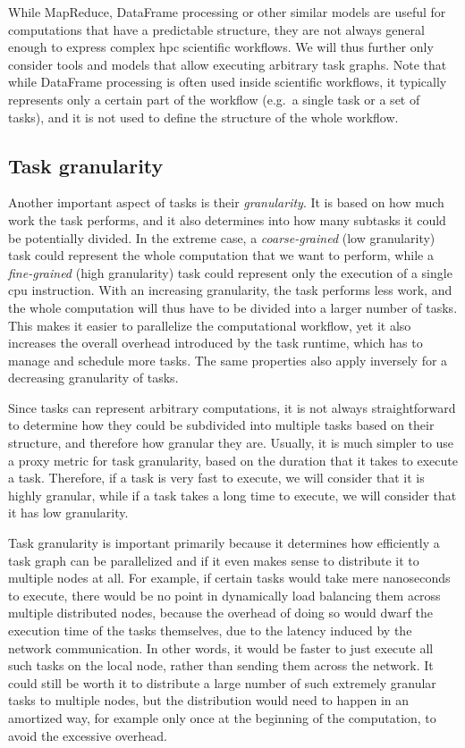 While MapReduce, DataFrame processing or other similar models are useful for computations that have
a predictable structure, they are not always general enough to express complex
\gls{hpc} scientific workflows. We will thus further only consider tools and models
that allow executing arbitrary task graphs. Note that while DataFrame processing is often used
inside scientific workflows, it typically represents only a certain part of the workflow (e.g.\ a
single task or a set of tasks), and it is not used to define the structure of the whole workflow.

\subsection{Task granularity}
\label{sec:task-granularity}
Another important aspect of tasks is their \emph{granularity}. It is based on how much work
the task performs, and it also determines into how many subtasks it could be potentially divided.
In the extreme case, a \emph{coarse-grained} (low granularity) task could represent the whole computation that we
want to perform, while a \emph{fine-grained} (high granularity) task could represent only the execution of a
single \gls{cpu} instruction. With an increasing granularity, the task performs less
work, and the whole computation will thus have to be divided into a larger number of tasks. This
makes it easier to parallelize the computational workflow, yet it also increases the overall
overhead introduced by the task runtime, which has to manage and schedule more tasks. The same
properties also apply inversely for a decreasing granularity of tasks.

Since tasks can represent arbitrary computations, it is not always straightforward to determine how
they could be subdivided into multiple tasks based on their structure, and therefore how granular
they are. Usually, it is much simpler to use a proxy metric for task granularity, based on the
duration that it takes to execute a task. Therefore, if a task is very fast to execute, we will
consider that it is highly granular, while if a task takes a long time to execute, we will consider
that it has low granularity.

Task granularity is important primarily because it determines how efficiently a task graph can be
parallelized and if it even makes sense to distribute it to multiple nodes at all. For example, if
certain tasks would take mere nanoseconds to execute, there would be no point in dynamically load
balancing them across multiple distributed nodes, because the overhead of doing so would dwarf the
execution time of the tasks themselves, due to the latency induced by the network communication. In
other words, it would be faster to just execute all such tasks on the local node, rather than
sending them across the network. It could still be worth it to distribute a large number of such
extremely granular tasks to multiple nodes, but the distribution would need to happen in an
amortized way, for example only once at the beginning of the computation, to avoid the excessive
overhead.

